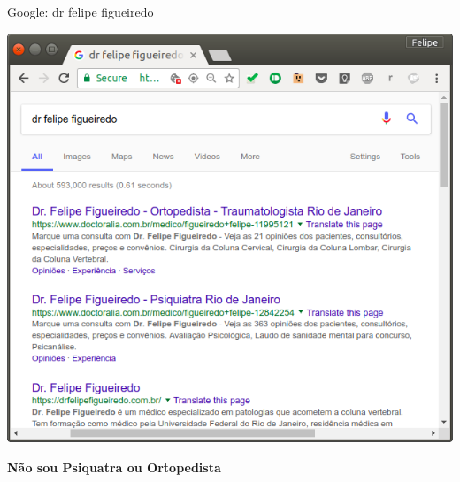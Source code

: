 \documentclass{beamer}
\begin{document}
\begin{frame}{Google: dr felipe figueiredo}
  \begin{center}
    \includegraphics[height=.7\textheight]{Intro/felipefigueiredo-not2}
    \begin{exampleblock}{}
      \begin{center}
        {\bf Não sou Psiquatra ou Ortopedista}
      \end{center}
    \end{exampleblock}
  \end{center}
\end{frame}
\end{document}
